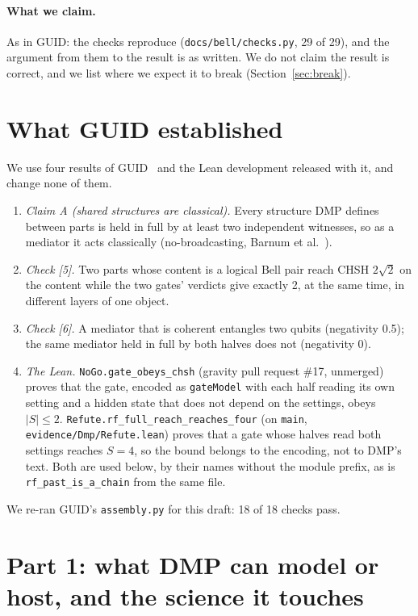 \documentclass[11pt,a4paper]{article}
\theoremstyle{definition}
\theoremstyle{remark}
\newcommand{\lean}[1]{\texttt{#1}}
\begin{document}
\paragraph{What we claim.} As in GUID: the checks reproduce (\texttt{docs/bell/checks.py}, 29 of 29), and the argument from them to the
result is as written. We do not claim the result is correct, and we list where we expect it to break (Section~\ref{sec:break}).

\section{What GUID established}\label{sec:guid}

We use four results of GUID~\cite{guid} and the Lean development released with it, and change none of them.

\begin{enumerate}[nosep]
\item \emph{Claim A (shared structures are classical).} Every structure DMP defines between parts is held in full by at least two
independent witnesses, so as a mediator it acts classically (no-broadcasting, Barnum et al.~\cite{barnum}).
\item \emph{Check [5].} Two parts whose content is a logical Bell pair reach CHSH $2\sqrt2$ on the content while the two gates' verdicts
give exactly 2, at the same time, in different layers of one object.
\item \emph{Check [6].} A mediator that is coherent entangles two qubits (negativity 0.5); the same mediator held in full by both halves
does not (negativity 0).
\item \emph{The Lean.} \lean{NoGo.gate\_obeys\_chsh} (gravity pull request \#17, unmerged) proves that the gate, encoded as
\lean{gateModel} with each half reading its own setting and a hidden state that does not depend on the settings, obeys
$|S|\le 2$. \lean{Refute.rf\_full\_reach\_reaches\_four} (on \texttt{main}, \texttt{evidence/Dmp/Refute.lean}) proves that a gate
whose halves read both settings reaches $S=4$, so the bound belongs to the encoding, not to DMP's text. Both are used below, by their
names without the module prefix, as is \lean{rf\_past\_is\_a\_chain} from the same file.
\end{enumerate}

\noindent We re-ran GUID's \texttt{assembly.py} for this draft: 18 of 18 checks pass.

\section{Part 1: what DMP can model or host, and the science it touches}\label{sec:part1}
\end{document}
